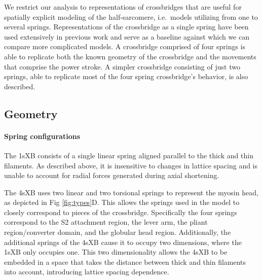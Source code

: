 \documentclass[]{article}
\begin{document}

We restrict our analysis to representations of crossbridges that are useful for spatially explicit modeling of the half-sarcomere, i.e.\ models utilizing from one to several springs.
Representations of the crossbridge as a single spring have been used extensively in previous work and serve as a baseline against which we can compare more complicated models.
A crossbridge comprised of four springs is able to replicate both the known geometry of the crossbridge and the movements that comprise the power stroke.
A simpler crossbridge consisting of just two springs, able to replicate most of the four spring crossbridge's behavior, is also described.

\subsection*{Geometry} %

\paragraph{Spring configurations} %
The 1sXB consists of a single linear spring aligned parallel to the thick and thin filaments.
As described above, it is insensitive to changes in lattice spacing and is unable to account for radial forces generated during axial shortening.

The 4sXB uses two linear and two torsional springs to represent the myosin head, as depicted in Fig \ref{fig:types}D.
This allows the springs used in the model to closely correspond to pieces of the crossbridge.
Specifically the four springs correspond to the S2 attachment region, the lever arm, the pliant region/converter domain, and the globular head region.
Additionally, the additional springs of the 4sXB cause it to occupy two dimensions, where the 1sXB only occupies one.
This two dimensionality allows the 4sXB to be embedded in a space that takes the distance between thick and thin filaments into account, introducing lattice spacing dependence.
\end{document}
